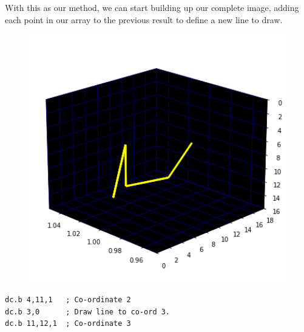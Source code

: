 With this as our method, we can start building up our complete image, adding each point in
our array to the previous result to define a new line to draw.

\begin{minipage}[c]{0.48\linewidth}
\begin{figure}[H]
    \centering
    \begin{adjustbox}{width=5.5cm,center}
      \includegraphics[width=12cm]{src/claws/build_claw_3_0.png}%
    \end{adjustbox}
\end{figure}
\end{minipage}
\begin{minipage}[c]{0.48\linewidth}
\begin{lstlisting}[basicstyle=\scriptsize\ttfamily]
dc.b 4,11,1   ; Co-ordinate 2
dc.b 3,0      ; Draw line to co-ord 3.
dc.b 11,12,1  ; Co-ordinate 3
\end{lstlisting}
\vspace*{\fill}
\end{minipage}

